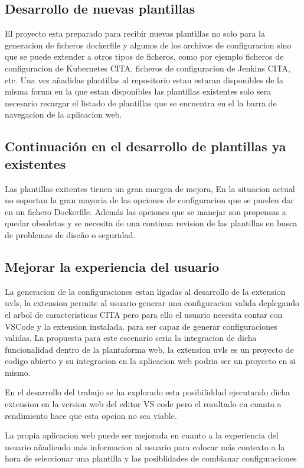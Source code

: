 \documentclass[12pt, a4paper, twoside]{article}
\begin{document}
\subsection{Desarrollo de nuevas plantillas }
El proyecto esta preparado para recibir nuevas plantillas no solo para la generacion de ficheros dockerfile y algunos de los archivos de configuracion sino que se puede extender a otros tipos de ficheros, como por ejemplo ficheros de configuracion de Kubernetes CITA, ficheros de configuracion de Jenkins CITA, etc.
Una vez añadidas plantillas al repositorio estan estaran disponibles de la misma forma en la que estan disponibles las plantillas existentes solo sera necesario recargar el listado de plantillas que se encuentra en el la barra de navegacion de la aplicacion web.
\subsection{Continuación en el desarrollo de plantillas ya existentes}
Las plantillas exitentes tienen un gran margen de mejora, En la situacion actual no soportan la gran mayoria de las opciones de configuracion que se pueden dar en un fichero Dockerfile. Además las opciones que se manejar son propensas a quedar obsoletas y se necesita de una continua revision de las plantillas en busca de problemas de diseño o seguridad.

\subsection{Mejorar la experiencia del usuario }
La generacion de la configuraciones estan ligadas al desarrollo de la extension uvls, la extension permite al usuario generar una configuracion valida deplegando el arbol de caracteristicas CITA pero para ello el usuario
necesita contar con VSCode y la extension instalada. para ser capaz de generar configuraciones validas. La propuesta para este escenario seria la integracion de dicha funcionalidad dentro de la plantaforma web,
la extension uvls es un proyecto de codigo abierto y su integracion en la aplicacion web podria ser un proyecto en si mismo. 

En el desarrollo del trabajo se ha explorado esta posibiliddad ejecutando dicha extension en la version
web del editor VS code pero el resultado en cuanto a rendimiento hace que esta opcion no sea viable.

La propia aplicacion web puede ser mejorada en cuanto a la experiencia del usuario añadiendo más informacion al usuario para colocar más contexto a la hora de seleccionar una plantilla y las posiblidades de combianar configuraciones 
\end{document}
